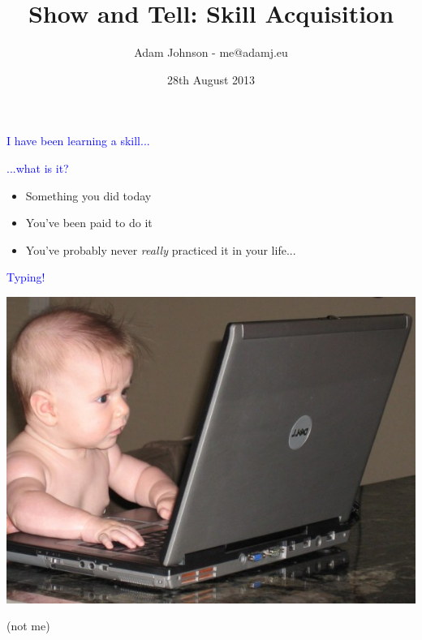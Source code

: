 \documentclass[landscape]{slides}
\title{Show and Tell: Skill Acquisition}
\author{Adam Johnson - me@adamj.eu}
\date{28th August 2013}
\begin{document}
\maketitle


\begin{slide}

    \textcolor{blue}{\Large{I have been learning a skill...}}

\end{slide}


\begin{slide}

    \textcolor{blue}{\Large{...what is it?}}

    \begin{itemize}
        \item Something you did today
        \item You've been paid to do it
        \item You've probably never \emph{really} practiced it in your life...
    \end{itemize}



\end{slide}


\begin{slide}

    \textcolor{blue}{\Large{Typing!}}

    \centering

    \includegraphics[height=10cm]{baby-nerd}

    (not me)

\end{slide}
\end{document}
